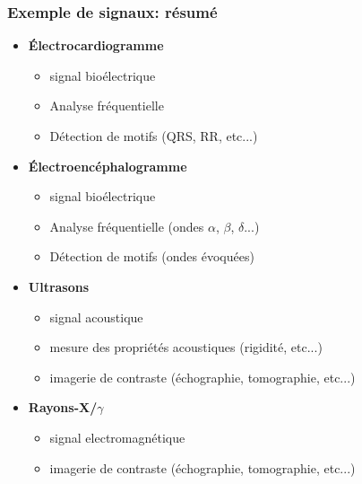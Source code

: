 \documentclass{beamer}
\begin{document}
\begin{frame}
\frametitle{Exemple de signaux: résumé}
\begin{itemize}
\item \textbf{\'Electrocardiogramme }
\begin{itemize}
\item signal bioélectrique
\item Analyse fréquentielle 
\item Détection de motifs (QRS, RR, etc...)
\end{itemize}
\vspace{0.1cm}
\item \textbf{\'Electroencéphalogramme}
\begin{itemize}
\item signal bioélectrique
\item Analyse fréquentielle (ondes $\alpha$, $\beta$, $\delta$...) 
\item Détection de motifs (ondes évoquées)
\end{itemize}
\vspace{0.1cm}
\item  \textbf{Ultrasons} 
\begin{itemize}
\item signal acoustique
\item mesure des propriétés acoustiques  (rigidité, etc...)
\item imagerie de contraste (échographie, tomographie, etc...)
\end{itemize}
\vspace{0.1cm}
\item \textbf{Rayons-X/$\gamma$}
\begin{itemize}
\item signal electromagnétique
\item imagerie de contraste (échographie, tomographie, etc...)
\end{itemize}
\end{itemize} 
\end{frame}
\end{document}
